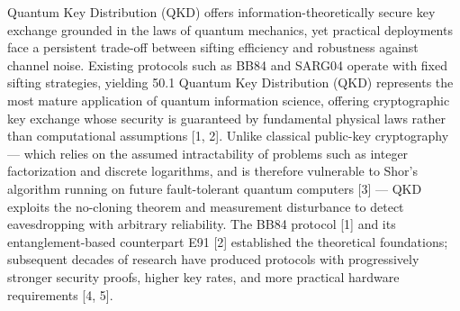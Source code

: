 Quantum Key Distribution (QKD) offers information-theoretically secure key exchange grounded in the laws of quantum mechanics, yet practical deployments face a persistent trade-off between sifting efficiency and robustness against channel noise. Existing protocols such as BB84 and SARG04 operate with fixed sifting strategies, yielding 50.1%
Quantum Key Distribution (QKD) represents the most mature application of quantum information science, offering cryptographic key exchange whose security is guaranteed by fundamental physical laws rather than computational assumptions [1, 2]. Unlike classical public-key cryptography — which relies on the assumed intractability of problems such as integer factorization and discrete logarithms, and is therefore vulnerable to Shor's algorithm running on future fault-tolerant quantum computers [3] — QKD exploits the no-cloning theorem and measurement disturbance to detect eavesdropping with arbitrary reliability. The BB84 protocol [1] and its entanglement-based counterpart E91 [2] established the theoretical foundations; subsequent decades of research have produced protocols with progressively stronger security proofs, higher key rates, and more practical hardware requirements [4, 5].

